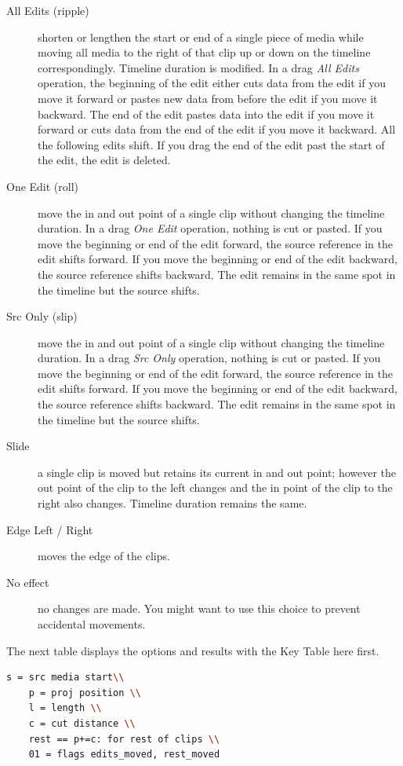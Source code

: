 \begin{description}
    \item[All Edits (ripple)] shorten or lengthen the start or end of a single piece of media while moving all media to the right of that clip up or down on the timeline correspondingly.  Timeline duration is modified.  In a drag \textit{All Edits} operation, the beginning of the edit either cuts data from the edit if you move it forward or pastes new data from before the edit if you move it backward. The end of the edit pastes data into the edit if you move it forward or cuts data from the end of the edit if you move it backward. All the following edits shift. If you drag the end of the edit past the start of the edit, the edit is deleted.
    \item[One Edit (roll)] move the in and out point of a single clip without changing the timeline duration. In a drag \textit{One Edit} operation, nothing is cut or pasted. If you move the beginning or end of the edit forward, the source reference in the edit shifts forward. If you move the beginning or end of the edit backward, the source reference shifts backward. The edit remains in the same spot in the timeline but the source shifts.
    \item[Src Only (slip)] move the in and out point of a single clip without changing the timeline duration. In a drag \textit{Src Only} operation, nothing is cut or pasted. If you move the beginning or end of the edit forward, the source reference in the edit shifts forward. If you move the beginning or end of the edit backward, the source reference shifts backward. The edit remains in the same spot in the timeline but the source shifts.
    \item[Slide] a single clip is moved but retains its current in and out point; however the out point of the clip to the left changes and the in point of the clip to the right also changes.  Timeline duration remains the same.
    \item[Edge Left / Right] moves the edge of the clips.
    \item[No effect] no changes are made.  You might want to use this choice to prevent accidental movements.
\end{description}
The next table displays the options and results with the Key Table here first.

\begin{lstlisting}[language=bash]
    s = src media start\\
    p = proj position \\
    l = length \\
    c = cut distance \\
    rest == p+=c: for rest of clips \\
    01 = flags edits_moved, rest_moved
\end{lstlisting}


